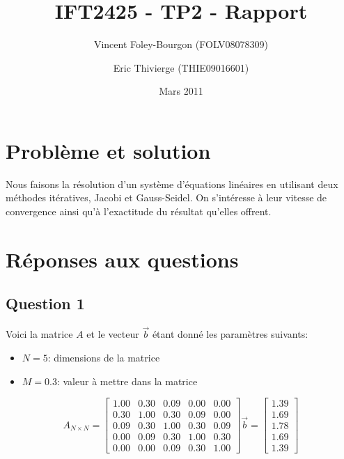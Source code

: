 \documentclass[10pt]{article}
\begin{document}
\title{IFT2425 - TP2 - Rapport}
\date{Mars 2011}
\author{Vincent Foley-Bourgon (FOLV08078309) \and
  Eric Thivierge (THIE09016601)}

\maketitle

\section{Problème et solution}

Nous faisons la résolution d'un système d'équations linéaires en
utilisant deux méthodes itératives, Jacobi et Gauss-Seidel.  On
s'intéresse à leur vitesse de convergence ainsi qu'à l'exactitude du
résultat qu'elles offrent.

\section{Réponses aux questions}

\subsection{Question 1}

Voici la matrice $A$ et le vecteur $\vec{b}$ étant donné les
paramètres suivants:

\begin{itemize}
\item $N = 5$: dimensions de la matrice
\item $M = 0.3$: valeur à mettre dans la matrice
\end{itemize}

\[
A_{N \times N} = \begin{bmatrix}
  1.00 & 0.30 & 0.09 & 0.00 & 0.00 \\
  0.30 & 1.00 & 0.30 & 0.09 & 0.00 \\
  0.09 & 0.30 & 1.00 & 0.30 & 0.09 \\
  0.00 & 0.09 & 0.30 & 1.00 & 0.30 \\
  0.00 & 0.00 & 0.09 & 0.30 & 1.00
\end{bmatrix}
\vec{b} = \begin{bmatrix}
  1.39 \\
  1.69 \\
  1.78 \\
  1.69 \\
  1.39
\end{bmatrix}
\]
\end{document}
